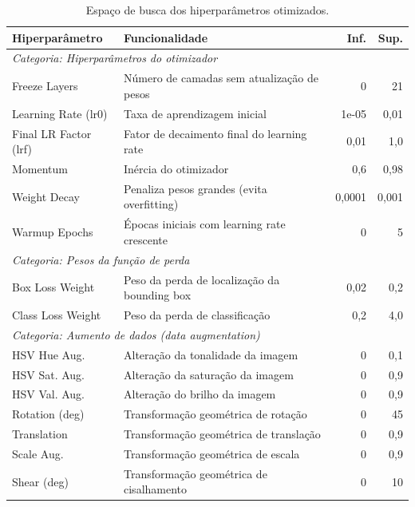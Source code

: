 \documentclass[12pt, a4paper]{article}
\begin{document}
\begin{table}[H]
\centering
\caption{Espaço de busca dos hiperparâmetros otimizados.}
\label{tab:hiperparametros}
\small
\begin{tabular}{p{3.6cm} p{6.6cm} r r}
\toprule
\textbf{Hiperparâmetro} & \textbf{Funcionalidade} & \textbf{Inf.} & \textbf{Sup.} \\
\midrule
\multicolumn{4}{l}{\textit{Categoria: Hiperparâmetros do otimizador}} \\
\midrule
Freeze Layers      & Número de camadas sem atualização de pesos       & 0      & 21 \\
Learning Rate (lr0)& Taxa de aprendizagem inicial                     & 1e-05  & 0,01 \\
Final LR Factor (lrf)& Fator de decaimento final do learning rate     & 0,01   & 1,0 \\
Momentum           & Inércia do otimizador                            & 0,6    & 0,98 \\
Weight Decay       & Penaliza pesos grandes (evita overfitting)       & 0,0001 & 0,001 \\
Warmup Epochs      & Épocas iniciais com learning rate crescente      & 0      & 5 \\
\midrule
\multicolumn{4}{l}{\textit{Categoria: Pesos da função de perda}} \\
\midrule
Box Loss Weight    & Peso da perda de localização da bounding box     & 0,02   & 0,2 \\
Class Loss Weight  & Peso da perda de classificação                   & 0,2    & 4,0 \\
\midrule
\multicolumn{4}{l}{\textit{Categoria: Aumento de dados (data augmentation)}} \\
\midrule
HSV Hue Aug.       & Alteração da tonalidade da imagem                & 0      & 0,1 \\
HSV Sat. Aug.      & Alteração da saturação da imagem                 & 0      & 0,9 \\
HSV Val. Aug.      & Alteração do brilho da imagem                    & 0      & 0,9 \\
Rotation (deg)     & Transformação geométrica de rotação              & 0      & 45 \\
Translation        & Transformação geométrica de translação           & 0      & 0,9 \\
Scale Aug.         & Transformação geométrica de escala               & 0      & 0,9 \\
Shear (deg)        & Transformação geométrica de cisalhamento         & 0      & 10 \\

\end{tabular}
\end{table}
\end{document}
